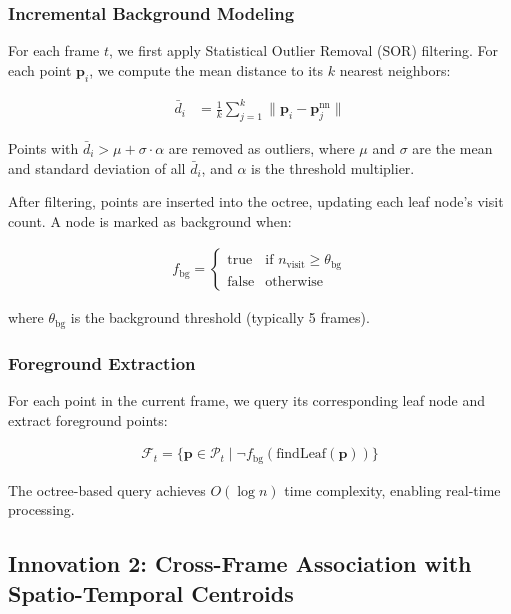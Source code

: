 \documentclass[numbered]{trbunofficial}
\begin{document}
\subsubsection{Incremental Background Modeling}

For each frame $t$, we first apply Statistical Outlier Removal (SOR) filtering. For each point $\mathbf{p}_i$, we compute the mean distance to its $k$ nearest neighbors:

\begin{align}
  \bar{d}_i &= \frac{1}{k} \sum_{j=1}^{k} \|\mathbf{p}_i - \mathbf{p}_{j}^{\text{nn}}\|
\end{align}

Points with $\bar{d}_i > \mu + \sigma \cdot \alpha$ are removed as outliers, where $\mu$ and $\sigma$ are the mean and standard deviation of all $\bar{d}_i$, and $\alpha$ is the threshold multiplier.

After filtering, points are inserted into the octree, updating each leaf node's visit count. A node is marked as background when:

\begin{align}
  f_{\text{bg}} = \begin{cases}
    \text{true} & \text{if } n_{\text{visit}} \geq \theta_{\text{bg}} \\
    \text{false} & \text{otherwise}
  \end{cases}
\end{align}

where $\theta_{\text{bg}}$ is the background threshold (typically 5 frames).

\subsubsection{Foreground Extraction}

For each point in the current frame, we query its corresponding leaf node and extract foreground points:

\begin{align}
  \mathcal{F}_t = \{\mathbf{p} \in \mathcal{P}_t \mid \neg f_{\text{bg}}(\text{findLeaf}(\mathbf{p}))\}
\end{align}

The octree-based query achieves $O(\log n)$ time complexity, enabling real-time processing.


\subsection{Innovation 2: Cross-Frame Association with Spatio-Temporal Centroids}
\end{document}
